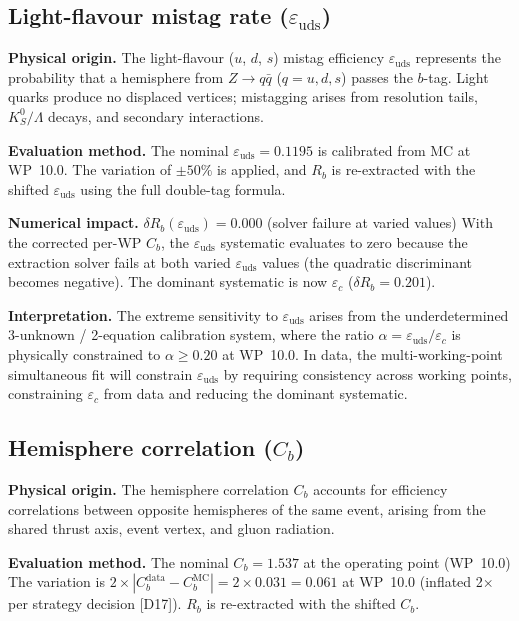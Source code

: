 \documentclass[11pt,a4paper]{article}
\begin{document}
\subsection{Light-flavour mistag rate ($\varepsilon_\mathrm{uds}$)}
\label{sec:syst_eps_uds}

\textbf{Physical origin.} The light-flavour ($u$, $d$, $s$) mistag efficiency
$\varepsilon_\mathrm{uds}$ represents the probability that a hemisphere from
$Z \to q\bar{q}$ ($q = u, d, s$) passes the $b$-tag. Light quarks produce no
displaced vertices; mistagging arises from resolution tails, $K_S^0/\Lambda$
decays, and secondary interactions.

\textbf{Evaluation method.} The nominal $\varepsilon_\mathrm{uds} = 0.1195$
is calibrated from MC at WP~10.0. The variation of $\pm 50\%$ is applied, and
$R_b$ is re-extracted with the shifted $\varepsilon_\mathrm{uds}$ using the
full double-tag formula.

\textbf{Numerical impact.}
$\delta R_b(\varepsilon_\mathrm{uds}) = 0.000$ (solver failure at varied values)
With the corrected per-WP $C_b$, the $\varepsilon_\mathrm{uds}$ systematic evaluates to zero
because the extraction solver fails at both varied $\varepsilon_\mathrm{uds}$ values (the
quadratic discriminant becomes negative). The dominant systematic is now $\varepsilon_c$
($\delta R_b = 0.201$).

\textbf{Interpretation.} The extreme sensitivity to $\varepsilon_\mathrm{uds}$ arises
from the underdetermined 3-unknown / 2-equation calibration system, where the ratio
$\alpha = \varepsilon_\mathrm{uds}/\varepsilon_c$ is physically constrained to
$\alpha \geq 0.20$ at WP~10.0. In data, the multi-working-point simultaneous fit
will constrain $\varepsilon_\mathrm{uds}$ by requiring consistency across working
points, constraining $\varepsilon_c$ from data and reducing the dominant systematic.

\subsection{Hemisphere correlation ($C_b$)}
\label{sec:syst_cb}

\textbf{Physical origin.} The hemisphere correlation $C_b$ accounts for efficiency
correlations between opposite hemispheres of the same event, arising from the shared
thrust axis, event vertex, and gluon radiation.

\textbf{Evaluation method.} The nominal $C_b = 1.537$ at the operating point (WP~10.0)
The variation
is $2 \times |C_b^\mathrm{data} - C_b^\mathrm{MC}| = 2 \times 0.031 = 0.061$ at WP~10.0
(inflated 2$\times$ per strategy decision [D17]).
$R_b$ is re-extracted with the shifted $C_b$.
\end{document}
